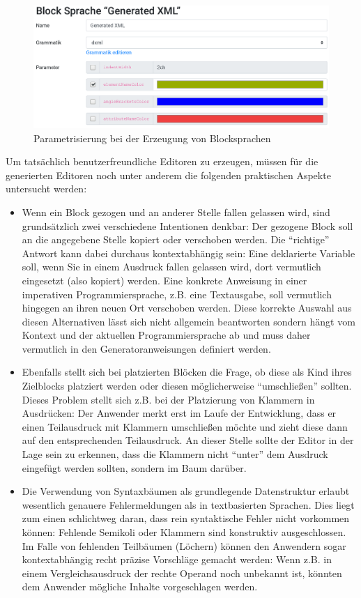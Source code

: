 \documentclass[paper=a4,fontsize=12pt,parskip=half]{scrartcl}
\begin{document}
\begin{figure}[p]
  \centering\includegraphics[width=\linewidth]{screenshot-generation-parameters.png}
  \caption{Parametrisierung bei der Erzeugung von Blocksprachen}
  \label{fig:block-lang-generation-parameters}
\end{figure}

Um tatsächlich benutzerfreundliche Editoren zu erzeugen, müssen für die generierten Editoren noch  unter anderem die folgenden praktischen Aspekte untersucht werden:

\begin{itemize}
\item Wenn ein Block gezogen und an anderer Stelle fallen gelassen wird, sind grundsätzlich zwei verschiedene Intentionen denkbar: Der gezogene Block soll an die angegebene Stelle kopiert oder verschoben werden. Die \enquote{richtige} Antwort kann dabei durchaus kontextabhängig sein: Eine deklarierte Variable soll, wenn Sie in einem Ausdruck fallen gelassen wird, dort vermutlich eingesetzt (also kopiert) werden. Eine konkrete Anweisung in einer imperativen Programmiersprache, z.B. eine Textausgabe, soll vermutlich hingegen an ihren neuen Ort verschoben werden. Diese korrekte Auswahl aus diesen Alternativen lässt sich nicht allgemein beantworten sondern hängt vom Kontext und der aktuellen Programmiersprache ab und muss daher vermutlich in den Generatoranweisungen definiert werden.
\item Ebenfalls stellt sich bei platzierten Blöcken die Frage, ob diese als Kind ihres Zielblocks platziert werden oder diesen möglicherweise \enquote{umschließen} sollten. Dieses Problem stellt sich z.B. bei der Platzierung von Klammern in Ausdrücken: Der Anwender merkt erst im Laufe der Entwicklung, dass er einen Teilausdruck mit Klammern umschließen möchte und zieht diese dann auf den entsprechenden Teilausdruck. An dieser Stelle sollte der Editor in der Lage sein zu erkennen, dass die Klammern nicht \enquote{unter} dem Ausdruck eingefügt werden sollten, sondern im Baum darüber.
\item Die Verwendung von Syntaxbäumen als grundlegende Datenstruktur erlaubt wesentlich genauere Fehlermeldungen als in textbasierten Sprachen. Dies liegt zum einen schlichtweg daran, dass rein syntaktische Fehler nicht vorkommen können: Fehlende Semikoli oder Klammern sind konstruktiv ausgeschlossen. Im Falle von fehlenden Teilbäumen (Löchern) können den Anwendern sogar kontextabhängig recht präzise Vorschläge gemacht werden: Wenn z.B. in einem Vergleichsausdruck der rechte Operand noch unbekannt ist, könnten dem Anwender mögliche Inhalte vorgeschlagen werden.
\end{itemize}
\end{document}
